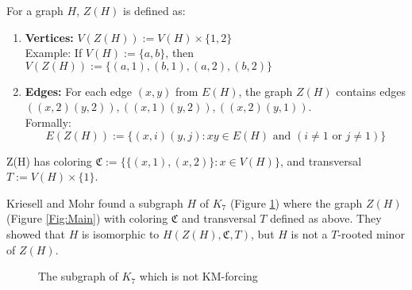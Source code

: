 \begin{defn}[$Z(H)$]
\label{defn:zg}
For a graph $H$, \emph{$Z(H)$} is defined as:
    \begin{enumerate}
        \item \textbf{Vertices:} $V(Z(H)) := V(H) \times \{1, 2\}$ \\
 Example: If $V(H):= \{a, b\}$, then $V(Z(H)):= \{(a,1), (b,1), (a,2), (b,2)\}$

        \item \textbf{Edges:} 
 For each edge $(x,y)$ from $E(H)$, the graph $Z(H)$ contains edges $((x,2)(y,2)), ((x,1)(y,2)),
 ((x,2)(y,1))$. \\
 Formally: \[ E(Z(H)) := \{(x,i)(y,j) : xy \in E(H) \text{ and } (i \neq 1 \text{ or } j \neq 1)\} \]
    \end{enumerate}
 Z(H) has coloring $\mathfrak{C} := \{\{(x,1),(x,2)\} : x \in V(H)\}$, and transversal $T := V(H) \times \{1\}$.

\end{defn}


Kriesell and Mohr found a subgraph $H$ of $K_7$ (Figure \ref{Fig:counterexample}) where the graph $Z(H)$ (Figure \ref{Fig:Main}) with coloring $\mathfrak{C}$ and transversal $T$ defined as above. 
They showed that $H$ is isomorphic to $H(Z(H), \mathfrak{C}, T)$, but $H$ is not a $T$-rooted minor of $Z(H)$.

\begin{figure}[H]
    \centering
        \caption{The subgraph of $K_7$ which is not KM-forcing}
        \label{Fig:counterexample}
\end{figure}




